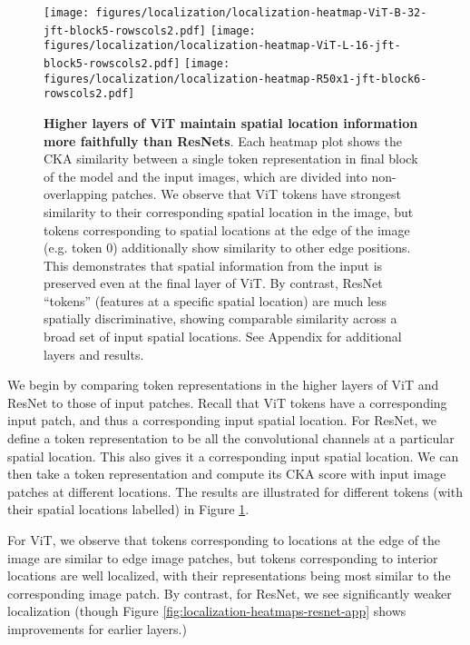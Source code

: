 \documentclass{article}
\begin{document}
\begin{figure}[t]
    \centering
    \texttt{[image: figures/localization/localization-heatmap-ViT-B-32-jft-block5-rowscols2.pdf]} 
    \texttt{[image: figures/localization/localization-heatmap-ViT-L-16-jft-block5-rowscols2.pdf]}
    \texttt{[image: figures/localization/localization-heatmap-R50x1-jft-block6-rowscols2.pdf]} \\
    \caption{\small \textbf{Higher layers of ViT maintain spatial location information more faithfully than ResNets}. Each heatmap plot shows the CKA similarity between a single token representation in final block of the model and the input images, which are divided into non-overlapping patches. We observe that ViT tokens have strongest similarity to their corresponding spatial location in the image, but tokens corresponding to spatial locations at the edge of the image (e.g. token 0) additionally show similarity to other edge positions. This demonstrates that spatial information from the input is preserved even at the final layer of ViT. By contrast, ResNet ``tokens'' (features at a specific spatial location) are much less spatially discriminative, showing comparable similarity across a broad set of input spatial locations. See Appendix for additional layers and results.}
    \label{fig:localization-heatmaps}
\end{figure}

We begin by comparing token representations in the higher layers of ViT and ResNet to those of input patches. Recall that ViT tokens have a corresponding input patch, and thus a corresponding input spatial location. For ResNet, we define a token representation to be all the convolutional channels at a particular spatial location. This also gives it a corresponding input spatial location. We can then take a token representation and compute its CKA score with input image patches at different locations. The results are illustrated for different tokens (with their spatial locations labelled) in Figure \ref{fig:localization-heatmaps}.

For ViT, we observe that tokens corresponding to locations at the edge of the image are similar to edge image patches, but tokens corresponding to interior locations are well localized, with their representations being most similar to the corresponding image patch. By contrast, for ResNet, we see significantly weaker localization (though Figure \ref{fig:localization-heatmaps-resnet-app} shows improvements for earlier layers.)
\end{document}
